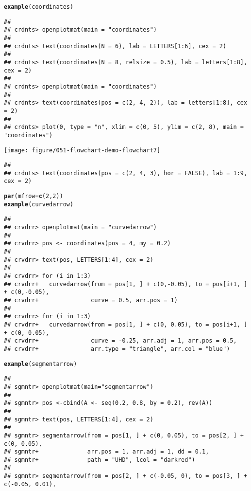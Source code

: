 \documentclass{article}\usepackage[]{graphicx}\usepackage[]{color}
\makeatletter
\def\maxwidth{ %
  \ifdim\Gin@nat@width>\linewidth
    \linewidth
  \else
    \Gin@nat@width
  \fi
}
\newcommand{\hlnum}[1]{\textcolor[rgb]{0.686,0.059,0.569}{#1}}%
\newcommand{\hlstd}[1]{\textcolor[rgb]{0.345,0.345,0.345}{#1}}%
\newcommand{\hlkwc}[1]{\textcolor[rgb]{0.333,0.667,0.333}{#1}}%
\newcommand{\hlkwd}[1]{\textcolor[rgb]{0.737,0.353,0.396}{\textbf{#1}}}%
\newenvironment{kframe}{%
 \def\at@end@of@kframe{}%
 \ifinner\ifhmode%
  \def\at@end@of@kframe{\end{minipage}}%
  \begin{minipage}{\columnwidth}%
 \fi\fi%
 \def\FrameCommand##1{\hskip\@totalleftmargin \hskip-\fboxsep
 \colorbox{shadecolor}{##1}\hskip-\fboxsep
     \hskip-\linewidth \hskip-\@totalleftmargin \hskip\columnwidth}%
 \MakeFramed {\advance\hsize-\width
   \@totalleftmargin\z@ \linewidth\hsize
   \@setminipage}}%
 {\par\unskip\endMakeFramed%
 \at@end@of@kframe}
\newenvironment{knitrout}{}{} %
\makeatother
\begin{document}
\begin{knitrout}
\begin{kframe}
\begin{verbatim}
\end{verbatim}
\begin{alltt}
\hlkwd{example}\hlstd{(coordinates)}
\end{alltt}
\begin{verbatim}
## 
## crdnts> openplotmat(main = "coordinates")
## 
## crdnts> text(coordinates(N = 6), lab = LETTERS[1:6], cex = 2)
## 
## crdnts> text(coordinates(N = 8, relsize = 0.5), lab = letters[1:8], cex = 2)
## 
## crdnts> openplotmat(main = "coordinates")
## 
## crdnts> text(coordinates(pos = c(2, 4, 2)), lab = letters[1:8], cex = 2)
## 
## crdnts> plot(0, type = "n", xlim = c(0, 5), ylim = c(2, 8), main = "coordinates")
\end{verbatim}
\end{kframe}
\texttt{[image: figure/051-flowchart-demo-flowchart7]} 
\begin{kframe}\begin{verbatim}
## 
## crdnts> text(coordinates(pos = c(2, 4, 3), hor = FALSE), lab = 1:9, cex = 2)
\end{verbatim}
\begin{alltt}
\hlkwd{par}\hlstd{(}\hlkwc{mfrow} \hlstd{=} \hlkwd{c}\hlstd{(}\hlnum{2}\hlstd{,} \hlnum{2}\hlstd{))}
\hlkwd{example}\hlstd{(curvedarrow)}
\end{alltt}
\begin{verbatim}
## 
## crvdrr> openplotmat(main = "curvedarrow")
## 
## crvdrr> pos <- coordinates(pos = 4, my = 0.2)
## 
## crvdrr> text(pos, LETTERS[1:4], cex = 2)
## 
## crvdrr> for (i in 1:3) 
## crvdrr+   curvedarrow(from = pos[1, ] + c(0,-0.05), to = pos[i+1, ] + c(0,-0.05),
## crvdrr+               curve = 0.5, arr.pos = 1)
## 
## crvdrr> for (i in 1:3) 
## crvdrr+   curvedarrow(from = pos[1, ] + c(0, 0.05), to = pos[i+1, ] + c(0, 0.05),
## crvdrr+               curve = -0.25, arr.adj = 1, arr.pos = 0.5, 
## crvdrr+               arr.type = "triangle", arr.col = "blue")
\end{verbatim}
\begin{alltt}
\hlkwd{example}\hlstd{(segmentarrow)}
\end{alltt}
\begin{verbatim}
## 
## sgmntr> openplotmat(main="segmentarrow")
## 
## sgmntr> pos <-cbind(A <- seq(0.2, 0.8, by = 0.2), rev(A))
## 
## sgmntr> text(pos, LETTERS[1:4], cex = 2)
## 
## sgmntr> segmentarrow(from = pos[1, ] + c(0, 0.05), to = pos[2, ] + c(0, 0.05),
## sgmntr+              arr.pos = 1, arr.adj = 1, dd = 0.1, 
## sgmntr+              path = "UHD", lcol = "darkred")
## 
## sgmntr> segmentarrow(from = pos[2, ] + c(-0.05, 0), to = pos[3, ] + c(-0.05, 0.01),

\end{verbatim}
\end{kframe}
\end{knitrout}
\end{document}

